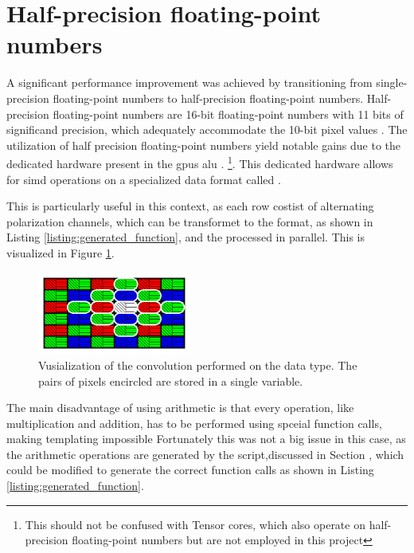 \section{Half-precision floating-point numbers}
A significant performance improvement was achieved by transitioning from single-precision floating-point numbers to half-precision floating-point numbers.
Half-precision floating-point numbers are 16-bit floating-point numbers with 11 bits of significand precision, which adequately accommodate the 10-bit pixel values \cite{HalfprecisionFloatingpointFormat2023}.
The utilization of half precision floating-point numbers yield notable gains due to the dedicated hardware present in the \gls{gpu}s \gls{alu} \cite{CUDA2023}.
\footnote{This should not be confused with Tensor cores, which also operate on half-precision floating-point numbers but are not employed in this project}.
This dedicated hardware allows for \gls{simd} operations on a specialized data format called  \cite{nvidiaHalf2ArithmeticFunctions2023}.

This is particularly useful in this context, as each row costist of alternating polarization channels, which can be transformet to the  format, as shown in Listing \ref{listing:generated_function}, and the processed in parallel.
This is visualized in Figure \ref{fig:half2_conv}.

\begin{figure}[H]
    \centering
    \includegraphics[width=0.45\textwidth]{figures/polarized_image/half2_conv.pdf}
    \caption{Vusialization of the convolution performed on the  data type. The pairs of pixels encircled are stored in a single  variable.}
    \label{fig:half2_conv}
\end{figure}

The main disadvantage of using  arithmetic is that every operation, like multiplication and addition, has to be performed using spceial function calls, making templating impossible \cite{nvidiaHalf2ArithmeticFunctions2023}
Fortunately this was not a big issue in this case, as the arithmetic operations are generated by the \py script,discussed in Section \todo, which could be modified to generate the correct function calls as shown in Listing \ref{listing:generated_function}.


